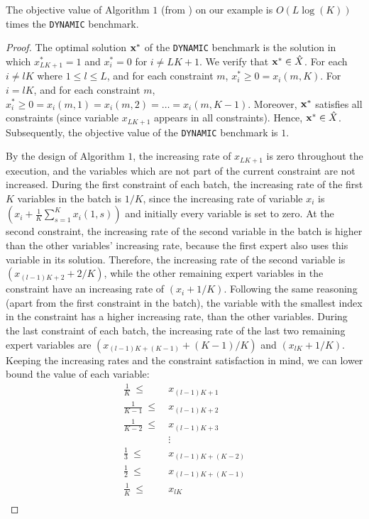 \begin{claim}
The objective value of Algorithm $1$ (from \cite{AnandGe22:Online-Algorithms}) on our example is $O(L \log(K))$ times the \texttt{DYNAMIC} benchmark.
\end{claim}
%
\begin{proof}
The optimal solution $\mathbf{x}^{*}$ of the \texttt{DYNAMIC} benchmark is the solution in which $x^{*}_{LK+1} = 1$ and $x^{*}_{i} = 0$ for $i \neq LK + 1$.
We verify that $\mathbf{x}^{*} \in \hat{X}$. For each $i \neq l K$ where $1 \leq l \leq L$, and for each constraint $m$, $x^{*}_{i} \geq 0 = x_{i}(m,K)$.
For $i = l K$, and for each constraint $m$, $x^{*}_{i} \geq 0 = x_{i}(m,1) = x_{i}(m,2) = \ldots = x_{i}(m,K-1)$.
Moreover, $\mathbf{x}^{*}$ satisfies all constraints (since variable $x_{LK+1}$ appears in all constraints).
Hence, $\mathbf{x}^{*} \in \hat{X}$. Subsequently, the objective value of the \texttt{DYNAMIC} benchmark is $1$.

     By the design of Algorithm $1$, the increasing rate of $x_{LK+1}$ is zero throughout the execution, and the variables which are not part of the current constraint are not increased. During the first constraint of each batch, the increasing rate of the first $K$ variables in the batch is $1/K$, since the increasing rate of variable $x_i$ is $(x_i + \frac{1}{K} \sum_{s=1}^{K} x_i(1,s))$ and initially every variable is set to zero. At the second constraint, the increasing rate of the second variable in the batch is higher than the other variables' increasing rate, because the first expert also uses this variable in its solution. Therefore, the increasing rate of the second variable is $(x_{(l-1) K + 2} + 2/K)$, while the other remaining expert variables in the constraint have an increasing rate of $(x_i + 1/K)$. Following the same reasoning (apart from the first constraint in the batch), the variable with the smallest index in the constraint has a higher increasing rate, than the other variables. During the last constraint of each batch, the increasing rate of the last two remaining expert variables are
     $(x_{(l-1) K + (K-1)} + (K-1)/K)$ and $(x_{lK} + 1/K)$. Keeping the increasing rates and the constraint satisfaction in mind, we can lower bound the value of each variable:
     \begin{align*}
          \frac{1}{K} \ \le& \ x_{(l-1) K + 1} \\
          \frac{1}{K-1} \ \le& \ x_{(l-1) K + 2} \\
          \frac{1}{K-2} \ \le& \ x_{(l-1) K + 3} \\
          & \ \vdots \\
          \frac{1}{3} \ \le& \ x_{(l-1) K + (K-2)} \\
          \frac{1}{2} \ \le& \ x_{(l-1) K + (K-1)} \\
          \frac{1}{K} \ \le& \ x_{lK} \\
     \end{align*}


\end{proof}
